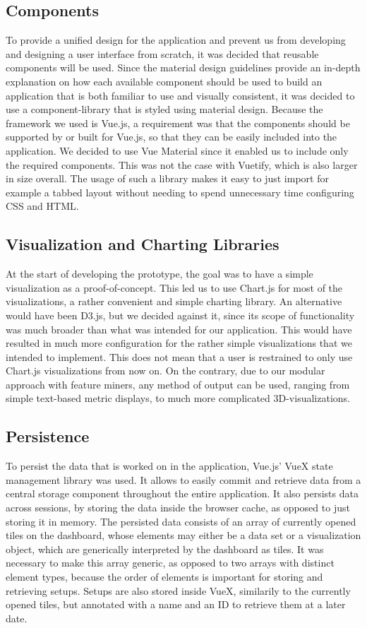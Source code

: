  \subsection{Components}
 To provide a unified design for the application and prevent us from developing and designing a user interface from scratch, it was decided that reusable components will be used. Since the material design guidelines provide an in-depth explanation on how each available component should be used to build an application that is both familiar to use and visually consistent, it was decided to use a component-library that is styled using material design. Because the framework we used is Vue.js, a requirement was that the components should be supported by or built for Vue.js, so that they can be easily included into the application. We decided to use Vue Material since it enabled us to include only the required components. This was not the case with Vuetify, which is also larger in size overall. The usage of such a library makes it easy to just import for example a tabbed layout without needing to spend unnecessary time configuring CSS and HTML.
 \subsection{Visualization and Charting Libraries}
 At the start of developing the prototype, the goal was to have a simple visualization as a proof-of-concept. This led us to use Chart.js for most of the visualizations, a rather convenient and simple charting library. An alternative would have been D3.js, but we decided against it, since its scope of functionality was much broader than what was intended for our application. This would have resulted in much more configuration for the rather simple visualizations that we intended to implement. This does not mean that a user is restrained to only use Chart.js visualizations from now on. On the contrary, due to our modular approach with feature miners, any method of output can be used, ranging from simple text-based metric displays, to much more complicated 3D-visualizations.
 \subsection{Persistence}
 To persist the data that is worked on in the application, Vue.js' VueX state management library was used. It allows to easily commit and retrieve data from a central storage component throughout the entire application. It also persists data across sessions, by storing the data inside the browser cache, as opposed to just storing it in memory. The persisted data consists of an array of currently opened tiles on the dashboard, whose elements may either be a data set or a visualization object, which are generically interpreted by the dashboard as tiles. It was necessary to make this array generic, as opposed to two arrays with distinct element types, because the order of elements is important for storing and retrieving setups. Setups are also stored inside VueX, similarily to the currently opened tiles, but annotated with a name and an ID to retrieve them at a later date. 
